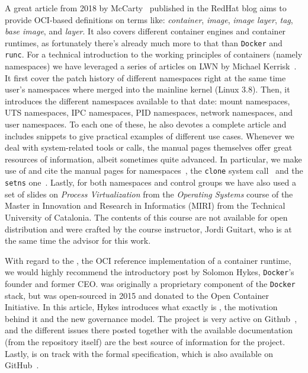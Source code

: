 A great article from 2018 by McCarty~\cite{McCarty2018} published in the RedHat blog aims to provide OCI-based definitions on terms like: \textit{container}, \textit{image}, \textit{image layer}, \textit{tag}, \textit{base image}, and \textit{layer}.
It also covers different container engines and container runtimes, as fortunately there's already much more to that than \texttt{Docker} and \texttt{runc}.
For a technical introduction to the working principles of containers (namely namespaces) we have leveraged a series of articles on LWN by Michael Kerrisk~\cite{Kerrisk2013}.
It first cover the patch history of different namespaces right at the same time user's namespaces where merged into the mainline kernel (Linux 3.8).
Then, it introduces the different namespaces available to that date: mount namespaces, UTS namespaces, IPC namespaces, PID namespaces, network namespaces, and user namespaces.
To each one of these, he also devotes a complete article and includes snippets to give practical examples of different use cases.
Whenever we deal with system-related tools or calls, the manual pages themselves offer great resources of information, albeit sometimes quite advanced.
In particular, we make use of and cite the manual pages for namespaces~\cite{namespaces-manual}, the \texttt{clone} system call~\cite{clone-manual} and the \texttt{setns} one~\cite{setns-manual}.
Lastly, for both namespaces and control groups we have also used a set of slides on \textit{Process Virtualization} from the \textit{Operating Systems} course of the Master in Innovation and Research in Informatics (MIRI) from the Technical University of Catalonia.
The contents of this course are not available for open distribution and were crafted by the course instructor, Jordi Guitart, who is at the same time the advisor for this work.

With regard to the \runc, the OCI reference implementation of a container runtime, we would highly recommend the introductory post by Solomon Hykes, \texttt{Docker}'s founder and former CEO.
\runc was originally a proprietary component of the \texttt{Docker} stack, but was open-sourced in 2015 and donated to the Open Container Initiative.
In this article, Hykes introduces what exactly is \runc, the motivation behind it and the new governance model.
The project is very active on Github~\cite{runc-memtrack}, and the different issues there posted together with the available documentation (from the repository itself) are the best source of information for the project.
Lastly, \runc is on track  with the formal specification, which is also available on GitHub~\cite{runc-spec}.

